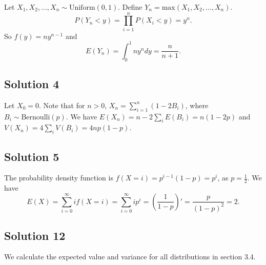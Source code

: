 Let $X_1, X_2, ..., X_n \sim \mathrm{Uniform}(0, 1)$.
Define $Y_n = \mathrm{max}(X_1, X_2, ..., X_n)$.
\begin{equation*}
    P(Y_n < y) = \prod_{i=1}^n P(X_i < y)
        = y^n.
\end{equation*}
So $f(y) = ny^{n-1}$ and
\begin{equation*}
    E(Y_n) = \int_0^1 ny^{n} dy
        = \frac{n}{n + 1}.
\end{equation*}


\subsection*{Solution 4}

Let $X_0 = 0$.
Note that for $n > 0$, $X_n = \sum_{i = 1}^n (1 - 2B_i)$, where $B_i \sim \mathrm{Bernoulli}(p)$.
We have $E(X_n) = n - 2\sum_i E(B_i) = n(1 - 2p)$ and $V(X_n) = 4\sum_i V(B_i) = 4np(1-p)$.


\subsection*{Solution 5}

The probability density function is $f(X = i) = p^{i - 1} (1 - p) = p^i$, as $p = \frac{1}{2}$.
We have
\begin{equation*}
    E(X) = \sum_{i = 0}^{\infty} if(X = i)
        = \sum_{i = 0}^{\infty} i p^i
        = \left( \frac{1}{1 - p} \right)'
        = \frac{p}{(1 - p)^2}
        = 2.
\end{equation*}
\subsection*{Solution 12}

We calculate the expected value and variance for all distributions in section 3.4.

